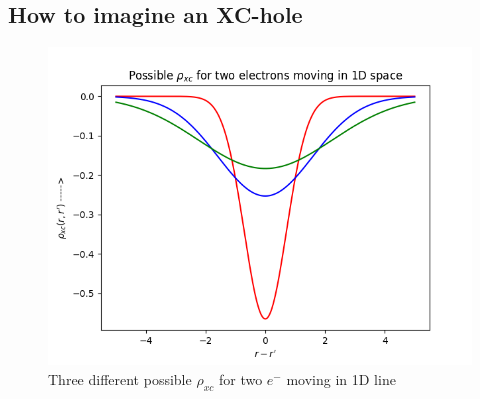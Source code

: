 \documentclass{article}
\begin{document}
 \subsection*{\Large{How to imagine an XC-hole}}
  \begin{figure}[h]
  \centering
  \includegraphics[scale=0.88]{nxc.png}
  \caption{Three different possible $\rho_{xc}$ for two $e^-$ moving in 1D line}
  \label{fig:Hole}
  \end{figure}
  
\end{document}
